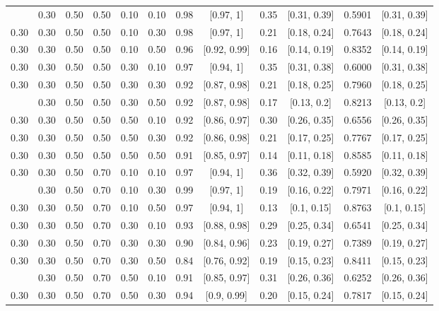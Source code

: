 \documentclass[
  11pt,
]{article}
\begin{document}
\begin{landscape}
\begin{ThreePartTable}
\begin{longtable}[t]{cccccccccccc}
\addlinespace
0.30 & 0.30 & 0.50 & 0.50 & 0.10 & 0.10 & 0.98 & {}[0.97, 1] & 0.35 & {}[0.31, 0.39] & 0.5901 & {}[0.31, 0.39]\\
0.30 & 0.30 & 0.50 & 0.50 & 0.10 & 0.30 & 0.98 & {}[0.97, 1] & 0.21 & {}[0.18, 0.24] & 0.7643 & {}[0.18, 0.24]\\
0.30 & 0.30 & 0.50 & 0.50 & 0.10 & 0.50 & 0.96 & {}[0.92, 0.99] & 0.16 & {}[0.14, 0.19] & 0.8352 & {}[0.14, 0.19]\\
0.30 & 0.30 & 0.50 & 0.50 & 0.30 & 0.10 & 0.97 & {}[0.94, 1] & 0.35 & {}[0.31, 0.38] & 0.6000 & {}[0.31, 0.38]\\
0.30 & 0.30 & 0.50 & 0.50 & 0.30 & 0.30 & 0.92 & {}[0.87, 0.98] & 0.21 & {}[0.18, 0.25] & 0.7960 & {}[0.18, 0.25]\\
\addlinespace
0.30 & 0.30 & 0.50 & 0.50 & 0.30 & 0.50 & 0.92 & {}[0.87, 0.98] & 0.17 & {}[0.13, 0.2] & 0.8213 & {}[0.13, 0.2]\\
0.30 & 0.30 & 0.50 & 0.50 & 0.50 & 0.10 & 0.92 & {}[0.86, 0.97] & 0.30 & {}[0.26, 0.35] & 0.6556 & {}[0.26, 0.35]\\
0.30 & 0.30 & 0.50 & 0.50 & 0.50 & 0.30 & 0.92 & {}[0.86, 0.98] & 0.21 & {}[0.17, 0.25] & 0.7767 & {}[0.17, 0.25]\\
0.30 & 0.30 & 0.50 & 0.50 & 0.50 & 0.50 & 0.91 & {}[0.85, 0.97] & 0.14 & {}[0.11, 0.18] & 0.8585 & {}[0.11, 0.18]\\
0.30 & 0.30 & 0.50 & 0.70 & 0.10 & 0.10 & 0.97 & {}[0.94, 1] & 0.36 & {}[0.32, 0.39] & 0.5920 & {}[0.32, 0.39]\\
\addlinespace
0.30 & 0.30 & 0.50 & 0.70 & 0.10 & 0.30 & 0.99 & {}[0.97, 1] & 0.19 & {}[0.16, 0.22] & 0.7971 & {}[0.16, 0.22]\\
0.30 & 0.30 & 0.50 & 0.70 & 0.10 & 0.50 & 0.97 & {}[0.94, 1] & 0.13 & {}[0.1, 0.15] & 0.8763 & {}[0.1, 0.15]\\
0.30 & 0.30 & 0.50 & 0.70 & 0.30 & 0.10 & 0.93 & {}[0.88, 0.98] & 0.29 & {}[0.25, 0.34] & 0.6541 & {}[0.25, 0.34]\\
0.30 & 0.30 & 0.50 & 0.70 & 0.30 & 0.30 & 0.90 & {}[0.84, 0.96] & 0.23 & {}[0.19, 0.27] & 0.7389 & {}[0.19, 0.27]\\
0.30 & 0.30 & 0.50 & 0.70 & 0.30 & 0.50 & 0.84 & {}[0.76, 0.92] & 0.19 & {}[0.15, 0.23] & 0.8411 & {}[0.15, 0.23]\\
\addlinespace
0.30 & 0.30 & 0.50 & 0.70 & 0.50 & 0.10 & 0.91 & {}[0.85, 0.97] & 0.31 & {}[0.26, 0.36] & 0.6252 & {}[0.26, 0.36]\\
0.30 & 0.30 & 0.50 & 0.70 & 0.50 & 0.30 & 0.94 & {}[0.9, 0.99] & 0.20 & {}[0.15, 0.24] & 0.7817 & {}[0.15, 0.24]\\

\end{longtable}
\end{ThreePartTable}
\end{landscape}
\end{document}
